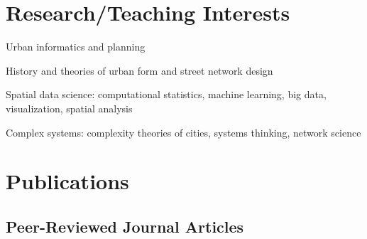 \documentclass[12pt,letterpaper]{report}
\newcommand{\listitemspace}{0.15em}
\renewenvironment{itemize}
{\begin{list}{}{\setlength{\leftmargin}{0em}
			\setlength{\parskip}{0em}
			\setlength{\itemsep}{\listitemspace}
			\setlength{\parsep}{\listitemspace}}}
	{\end{list}}
\begin{document}
	
	
	\section*{Research/Teaching Interests}
	
	\begin{itemize}
		
		\item Urban informatics and planning
		
		\item History and theories of urban form and street network design
		
		\item Spatial data science: computational statistics, machine learning, big data, visualization, spatial analysis
		
		\item Complex systems: complexity theories of cities, systems thinking, network science
		
	\end{itemize}
	
	
	
	\section*{Publications}
	
	\subsection*{Peer-Reviewed Journal Articles}
	
\end{document}
